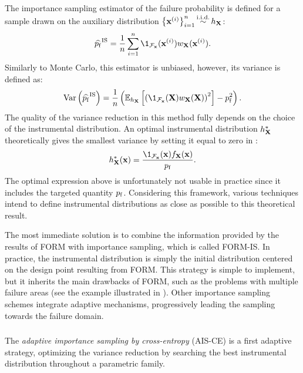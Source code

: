 The importance sampling estimator of the failure probability is defined for a sample drawn on the auxiliary distribution $\left\{{\bf x}^{(i)}\right\}_{i=1}^n \mathop{\sim}\limits^{\mathrm{i.i.d.}} h_{\bf X}$: 
\begin{equation}
    \what{\pf}^{\mathrm{IS}} = \frac1n \sum_{i=1}^{n} \1_{\iF_\bx}(\bx^{(i)}) w_\bX(\bx^{(i)}).
\end{equation}
Similarly to Monte Carlo, this estimator is unbiased, however, its variance is defined as: 
\begin{equation}
    \var\left( \what{\pf}^{\mathrm{IS}}\right) = \frac1n \left( \E_{h_\bX}\left[\left(\1_{\iF_\bx}(\bX) w_\bX(\bX)\right)^2\right] - \pf^2\right).
    \label{eq:IS_variance}
\end{equation}
The quality of the variance reduction in this method fully depends on the choice of the instrumental distribution. 
An optimal instrumental distribution $h_{{\bf X}}^*$ theoretically gives the smallest variance by setting it equal to zero in : 
\begin{equation}
    h_{\bX}^*(\bx) = \frac{\1_{\iF_\bx}(\bx) f_\bX(\bx)}{\pf}. 
\end{equation}
The optimal expression above is unfortunately not usable in practice since it includes the targeted quantity $p_\mathrm{f}$. 
Considering this framework, various techniques intend to define instrumental distributions as close as possible to this theoretical result. 

The most immediate solution is to combine the information provided by the results of FORM with importance sampling, which is called FORM-IS. 
In practice, the instrumental distribution is simply the initial distribution centered on the design point resulting from FORM. 
This strategy is simple to implement, but it inherits the main drawbacks of FORM, such as the problems with multiple failure areas (see the example illustrated in ).
Other importance sampling schemes integrate adaptive mechanisms, progressively leading the sampling towards the failure domain.  

\subsubsection{}


The \textit{adaptive importance sampling by cross-entropy} (AIS-CE) is a first adaptive strategy, optimizing the variance reduction by searching the best instrumental distribution throughout a parametric family.

